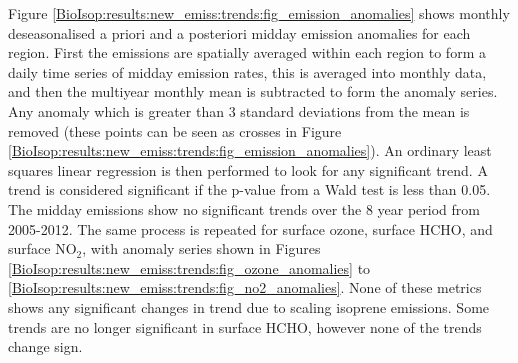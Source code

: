       Figure \ref{BioIsop:results:new_emiss:trends:fig_emission_anomalies} shows monthly deseasonalised a priori and a posteriori midday emission anomalies for each region.
      First the emissions are spatially averaged within each region to form a daily time series of midday emission rates, this is averaged into monthly data, and then the multiyear monthly mean is subtracted to form the anomaly series.
      Any anomaly which is greater than 3 standard deviations from the mean is removed (these points can be seen as crosses in Figure \ref{BioIsop:results:new_emiss:trends:fig_emission_anomalies}).
      An ordinary least squares linear regression is then performed to look for any significant trend.
      A trend is considered significant if the p-value from a Wald test is less than 0.05.
      The midday emissions show no significant trends over the 8 year period from 2005-2012.
      The same process is repeated for surface ozone, surface HCHO, and surface NO$_2$, with anomaly series shown in Figures \ref{BioIsop:results:new_emiss:trends:fig_ozone_anomalies} to \ref{BioIsop:results:new_emiss:trends:fig_no2_anomalies}.
      None of these metrics shows any significant changes in trend due to scaling isoprene emissions.
      Some trends are no longer significant in surface HCHO, however none of the trends change sign.
      
      
      
      
      
